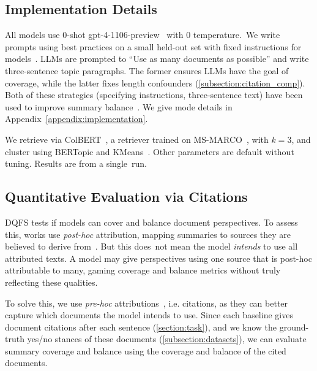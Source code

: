 


\subsection{Implementation Details} \label{subsection:implementation}

All models use 0-shot gpt-4-1106-preview~\cite{achiam2023gpt} with 0 temperature.~We write prompts using best practices on a small held-out set with fixed instructions for models~\cite{schulhoff2024prompt}.
LLMs are prompted to ``Use as many documents as possible'' and write three-sentence topic paragraphs.
The former ensures LLMs have the goal of coverage, while the latter fixes length confounders (\cref{subsection:citation_comp}).
Both of these strategies (specifying instructions, three-sentence text) have been used to improve summary balance~\cite{zhang-etal-2024-fair}.
We give mode details in Appendix~\ref{appendix:implementation}.

We retrieve via ColBERT~\cite{khattab2020colbert}, a retriever trained on MS-MARCO~\cite{Campos2016MSMA}, with $k=3$, and cluster using BERTopic and KMeans~\cite{macqueen1967some, grootendorst2022bertopic}.
Other parameters are default without tuning.
Results are from a single~run.



\subsection{Quantitative Evaluation via Citations} \label{subsection:metrics}

DQFS tests if models can cover and balance document perspectives.
To assess this, works use \textit{post-hoc} attribution, mapping summaries to sources they are believed to derive from~\cite{wolhandler2022multi, zhang-etal-2024-fair}.
But this does~not mean the model \textit{intends} to use all attributed texts.
A model may give perspectives using one source that is post-hoc attributable to many, gaming coverage and balance metrics without truly reflecting these qualities.

To solve this, we use \textit{pre-hoc} attributions~\cite{huang-chang-2024-citation}, i.e. citations, as they can better capture which documents the model intends to use.
Since each baseline gives document citations after each sentence (\cref{section:task}), and we know the ground-truth yes/no stances of these documents (\cref{subsection:datasets}), we can evaluate summary coverage and balance using the coverage and balance of the cited documents.

